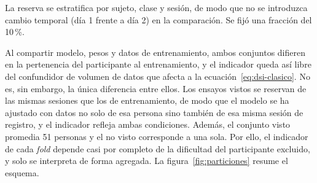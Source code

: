 La reserva se estratifica por sujeto, clase y sesión, de modo que no se
introduzca cambio temporal (día 1 frente a día 2) en la comparación. Se fijó una
fracción del 10\,\%.

Al compartir modelo, pesos y datos de entrenamiento, ambos conjuntos difieren en la
pertenencia del participante al entrenamiento, y el indicador queda así libre del
confundidor de volumen de datos que afecta a la ecuación~\eqref{eq:dsi-clasico}. No es, sin
embargo, la única diferencia entre ellos. Los ensayos vistos se reservan de las mismas
sesiones que los de entrenamiento, de modo que el modelo se ha ajustado con datos no solo
de esa persona sino también de esa misma sesión de registro, y el indicador refleja ambas
condiciones. Además, el conjunto visto promedia 51 personas y el no visto corresponde a una sola.
Por ello, el indicador de cada \textit{fold} depende casi por completo de la dificultad
del participante excluido, y solo se interpreta de forma agregada. La figura~\ref{fig:particiones} resume el
esquema.

